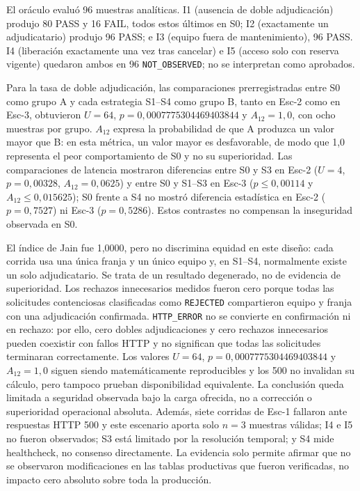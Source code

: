 El oráculo evaluó 96 muestras analíticas. I1 (ausencia de doble adjudicación)
produjo 80 PASS y 16 FAIL, todos estos últimos en S0; I2 (exactamente un
adjudicatario) produjo 96 PASS; e I3 (equipo fuera de mantenimiento), 96 PASS.
I4 (liberación exactamente una vez tras cancelar) e I5 (acceso solo con reserva
vigente) quedaron ambos en 96 \texttt{NOT\_OBSERVED}; no se interpretan como
aprobados.

Para la tasa de doble adjudicación, las comparaciones prerregistradas entre S0
como grupo A y cada estrategia S1--S4 como grupo B, tanto en Esc-2 como en
Esc-3, obtuvieron $U=64$, $p=0,0007775304469403844$ y $A_{12}=1,0$, con ocho muestras por
grupo. $A_{12}$ expresa la probabilidad de que A produzca un valor mayor que B:
en esta métrica, un valor mayor es desfavorable, de modo que 1,0 representa el
peor comportamiento de S0 y no su superioridad. Las comparaciones de latencia
mostraron diferencias entre S0 y S3 en Esc-2 ($U=4$, $p=0,00328$,
$A_{12}=0,0625$) y entre S0 y S1--S3 en Esc-3 ($p\leq0,00114$ y
$A_{12}\leq0,015625$); S0 frente a S4 no mostró diferencia estadística en
Esc-2 ($p=0,7527$) ni Esc-3 ($p=0,5286$). Estos contrastes no compensan la
inseguridad observada en S0.

El índice de Jain fue 1,0000, pero no discrimina equidad en este diseño: cada
corrida usa una única franja y un único equipo y, en S1--S4, normalmente existe
un solo adjudicatario. Se trata de un resultado degenerado, no de evidencia de
superioridad. Los rechazos innecesarios medidos fueron cero porque todas las
solicitudes contenciosas clasificadas como \texttt{REJECTED} compartieron equipo
y franja con una adjudicación confirmada. \texttt{HTTP\_ERROR} no se convierte
en confirmación ni en rechazo: por ello, cero dobles adjudicaciones y cero
rechazos innecesarios pueden coexistir con fallos HTTP y no significan que todas
las solicitudes terminaran correctamente. Los valores $U=64$,
$p=0,0007775304469403844$ y $A_{12}=1,0$ siguen siendo matemáticamente
reproducibles y los 500 no invalidan su cálculo, pero tampoco prueban
disponibilidad equivalente. La conclusión queda limitada a seguridad observada
bajo la carga ofrecida, no a corrección o superioridad operacional absoluta.
Además, siete corridas de Esc-1 fallaron ante respuestas HTTP 500 y este
escenario aporta solo $n=3$ muestras válidas; I4 e I5 no
fueron observados; S3 está limitado por la resolución temporal; y S4 mide
healthcheck, no consenso directamente. La evidencia solo permite afirmar que no
se observaron modificaciones en las tablas productivas que fueron verificadas,
no impacto cero absoluto sobre toda la producción.

